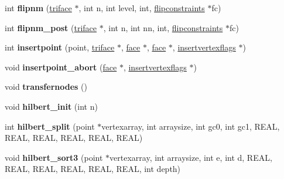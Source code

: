 \begin{DoxyCompactItemize}
\item 
\mbox{\label{classtetgenmesh_aab593bf52c98bf0315b39afc65c06312}} 
int {\bfseries flipnm} (\hyperlink{classtetgenmesh_1_1triface}{triface} $\ast$, int n, int level, int, \hyperlink{classtetgenmesh_1_1flipconstraints}{flipconstraints} $\ast$fc)
\item 
\mbox{\label{classtetgenmesh_ac77db19e27c38b0ddace0482ffbd28a0}} 
int {\bfseries flipnm\+\_\+post} (\hyperlink{classtetgenmesh_1_1triface}{triface} $\ast$, int n, int nn, int, \hyperlink{classtetgenmesh_1_1flipconstraints}{flipconstraints} $\ast$fc)
\item 
\mbox{\label{classtetgenmesh_a5d85611ca91db181e357457beb13a633}} 
int {\bfseries insertpoint} (point, \hyperlink{classtetgenmesh_1_1triface}{triface} $\ast$, \hyperlink{classtetgenmesh_1_1face}{face} $\ast$, \hyperlink{classtetgenmesh_1_1face}{face} $\ast$, \hyperlink{classtetgenmesh_1_1insertvertexflags}{insertvertexflags} $\ast$)
\item 
\mbox{\label{classtetgenmesh_ac7173aaaeb5600daa685af9c2c718834}} 
void {\bfseries insertpoint\+\_\+abort} (\hyperlink{classtetgenmesh_1_1face}{face} $\ast$, \hyperlink{classtetgenmesh_1_1insertvertexflags}{insertvertexflags} $\ast$)
\item 
\mbox{\label{classtetgenmesh_aca4cdd18ce8662d83d00f3be302e594d}} 
void {\bfseries transfernodes} ()
\item 
\mbox{\label{classtetgenmesh_a5b84bd9ae3b1797a1e11730b23c1a2c0}} 
void {\bfseries hilbert\+\_\+init} (int n)
\item 
\mbox{\label{classtetgenmesh_a11227c742897ec6e617a82dc61fc460d}} 
int {\bfseries hilbert\+\_\+split} (point $\ast$vertexarray, int arraysize, int gc0, int gc1, R\+E\+AL, R\+E\+AL, R\+E\+AL, R\+E\+AL, R\+E\+AL, R\+E\+AL)
\item 
\mbox{\label{classtetgenmesh_a49edbd210b6c45754eca98046b0ef477}} 
void {\bfseries hilbert\+\_\+sort3} (point $\ast$vertexarray, int arraysize, int e, int d, R\+E\+AL, R\+E\+AL, R\+E\+AL, R\+E\+AL, R\+E\+AL, R\+E\+AL, int depth)
\item 

\end{DoxyCompactItemize}
